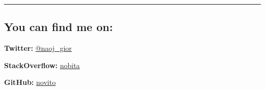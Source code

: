 \documentclass[10pt,a4paper]{article}
\newcommand*\roottitle[1]{\subsection*{#1}\vspace{-0.3em}\nopagebreak[4]}
\newlength{\newparindent}
\newlength{\doubleparindent}
\newcommand{\breakvspace}[1]{\pagebreak[2]\vspace{#1}\pagebreak[2]}
\newcommand{\nobreakvspace}[1]{\nopagebreak[4]\vspace{#1}\nopagebreak[4]}
\newcommand{\spacedhrule}[2]{\breakvspace{#1}\hrule\nobreakvspace{#2}}
\newcommand{\inlineheadsection}[2]{\begin{basedescript}{\setlength{\leftmargin}{\doubleparindent}}\item[\hspace{\newparindent}\textbf{#1}]#2\end{basedescript}\vspace{-1.7em}}
\begin{document}
\spacedhrule{1.6em}{-0.4em}

\roottitle{You can find me on:}

\inlineheadsection  %
  {Twitter:}
  {\href{http://twitter.com/naoj_gior}{@naoj\_gior}}
\inlineheadsection
  {StackOverflow:}
  {\href{http://stackoverflow.com/users/585456/nobita}{nobita}}
\inlineheadsection
  {GitHub:}
  {\href{http://github.com/novito}{novito}}
\end{document}
